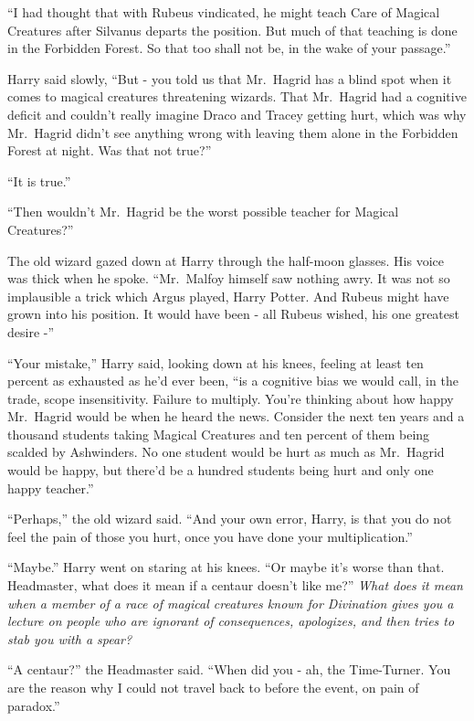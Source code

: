 ``I had thought that with Rubeus vindicated, he might teach Care of
Magical Creatures after Silvanus departs the position. But much of that
teaching is done in the Forbidden Forest. So that too shall not be, in
the wake of your passage.''

Harry said slowly, ``But - you told us that Mr.~Hagrid has a blind spot
when it comes to magical creatures threatening wizards. That Mr.~Hagrid
had a cognitive deficit and couldn't really imagine Draco and Tracey
getting hurt, which was why Mr.~Hagrid didn't see anything wrong with
leaving them alone in the Forbidden Forest at night. Was that not
true?''

``It is true.''

``Then wouldn't Mr.~Hagrid be the worst possible teacher for Magical
Creatures?''

The old wizard gazed down at Harry through the half-moon glasses. His
voice was thick when he spoke. ``Mr.~Malfoy himself saw nothing awry. It
was not so implausible a trick which Argus played, Harry Potter. And
Rubeus might have grown into his position. It would have been - all
Rubeus wished, his one greatest desire -''

``Your mistake,'' Harry said, looking down at his knees, feeling at
least ten percent as exhausted as he'd ever been, ``is a cognitive bias
we would call, in the trade, scope insensitivity. Failure to multiply.
You're thinking about how happy Mr.~Hagrid would be when he heard the
news. Consider the next ten years and a thousand students taking Magical
Creatures and ten percent of them being scalded by Ashwinders. No one
student would be hurt as much as Mr.~Hagrid would be happy, but there'd
be a hundred students being hurt and only one happy teacher.''

``Perhaps,'' the old wizard said. ``And your own error, Harry, is that
you do not feel the pain of those you hurt, once you have done your
multiplication.''

``Maybe.'' Harry went on staring at his knees. ``Or maybe it's worse
than that. Headmaster, what does it mean if a centaur doesn't like me?''
\emph{What does it mean when a member of a race of magical creatures
known for Divination gives you a lecture on people who are ignorant of
consequences, apologizes, and then tries to stab you with a spear?}

``A centaur?'' the Headmaster said. ``When did you - ah, the
Time-Turner. You are the reason why I could not travel back to before
the event, on pain of paradox.''

